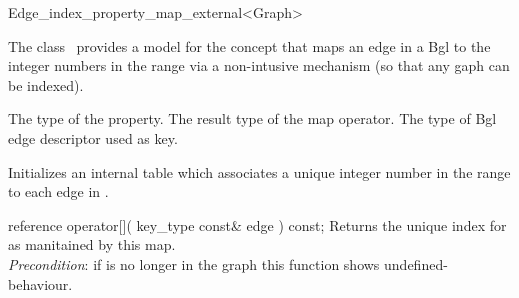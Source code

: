 

\begin{ccRefClass}{Edge_index_property_map_external<Graph>}


\ccDefinition

The class \ccRefName\ provides a model for the concept 
that maps an edge in a {\sc Bgl}
to the integer numbers in the range 
via a non-intusive mechanism (so that any gaph can be indexed).


\ccTypes
    {The type of the property.}
\ccGlue
    {The result type of the map operator.}
\ccGlue
\ccGlue
  {The type of {\sc Bgl} edge descriptor used as key.}

\ccCreation
{}  %

{Initializes an internal table which associates a unique integer
number in the range  to each edge in .}

\ccOperations

\ccMethod
  {reference operator[]( key_type const& edge ) const;}
  {Returns the unique index for  as manitained by this map.\\
  {\em Precondition}: if  is no longer in the graph this function shows undefined-behaviour.
  }
    
\ccIsModel
{} 

\ccSeeAlso
{}\\

\end{ccRefClass}


